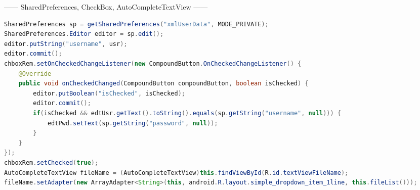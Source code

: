 \documentclass[10pt,a4paper,twocolumn]{report}
\begin{document}
\begin{CJK}{UTF8}{Courier New}
------ SharedPreferences, CheckBox, AutoCompleteTextView ------
\begin{lstlisting}[language=Java]
SharedPreferences sp = getSharedPreferences("xmlUserData", MODE_PRIVATE);
SharedPreferences.Editor editor = sp.edit();
editor.putString("username", usr);
editor.commit();
chboxRem.setOnCheckedChangeListener(new CompoundButton.OnCheckedChangeListener() {
	@Override
	public void onCheckedChanged(CompoundButton compoundButton, boolean isChecked) {
		editor.putBoolean("isChecked", isChecked);
		editor.commit();
		if(isChecked && edtUsr.getText().toString().equals(sp.getString("username", null))) {
			edtPwd.setText(sp.getString("password", null));
		}
	}
});
chboxRem.setChecked(true);
AutoCompleteTextView fileName = (AutoCompleteTextView)this.findViewById(R.id.textViewFileName);
fileName.setAdapter(new ArrayAdapter<String>(this, android.R.layout.simple_dropdown_item_1line, this.fileList()));
\end{lstlisting}


\end{CJK}
\end{document}
